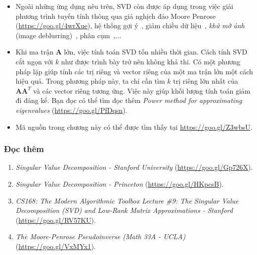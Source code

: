 \begin{itemize}

\item Ngoài những ứng dụng nêu trên, SVD còn được áp dụng trong việc giải phương
trình tuyến tính thông qua giả nghịch đảo Moore Penrose
(\url{https://goo.gl/4wrXue}), hệ thống gợi ý~\cite{sarwar2000application}, giảm chiều dữ liệu~\cite{cybenko1989approximation}, \textit{khử mờ ảnh} (image deblurring)~\cite{hansen2006deblurring},
phân cụm~\cite{drineas2004clustering},...

\item Khi ma trận $\mathbf{A}$ lớn, việc tính toán SVD tốn nhiều thời
gian. Cách tính SVD cắt ngọn với $k$ như được trình bày trở nên không khả thi. Có một phương pháp lặp giúp tính
các trị riêng và vector riêng của một ma trận lớn một cách hiệu quả. Trong phương pháp này, ta
chỉ cần tìm $k$ trị riêng lớn nhất của $\mathbf{AA}^T$ và các vector riêng
tương ứng. Việc này giúp khối lượng tính toán giảm đi đáng kể. Bạn đọc có thể
tìm đọc thêm \textit{Power method for approximating eigenvalues}
(\url{https://goo.gl/PfDqsn}).


\item Mã nguồn trong chương này có thể được tìm thấy tại \url{https://goo.gl/Z3wbsU}.
\end{itemize}




\subsubsection{Đọc thêm}
\begin{enumerate}
\item \textit{Singular Value Decomposition - Stanford University} (\url{https://goo.gl/Gp726X}).

\item \textit{Singular Value Decomposition - Princeton} (\url{https://goo.gl/HKpcsB}).

\item \textit{CS168: The Modern Algorithmic Toolbox Lecture \#9: The Singular
Value Decomposition (SVD) and Low-Rank Matrix Approximations - Stanford}
(\url{https://goo.gl/RV57KU}).

\item \textit{The Moore-Penrose Pseudoinverse (Math 33A - UCLA)} (\url{https://goo.gl/VxMYx1}).
\end{enumerate}
